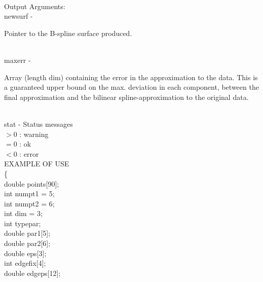 \\
        \>Output Arguments:\\
        \>\>    {\fov newsurf}\> - \>           \begin{minipg2}
                                Pointer to the B-spline surface produced.
                                \end{minipg2}\\
        \>\>    {\fov maxerr}\> - \>    \begin{minipg2}
                                Array (length dim)
                                containing the error in the approximation to the data.
                                This is a guaranteed upper bound on the max. deviation
                                in each component, between the final approximation
                                and the bilinear spline-approximation to the original
                                data.
                                \end{minipg2}\\[0.3ex]
        \>\>    {\fov stat}     \> - \> Status messages\\
                \>\>\>\>\>              $> 0$   : warning\\
                \>\>\>\>\>              $= 0$   : ok\\
                \>\>\>\>\>              $< 0$   : error\\
\newpagetabs
EXAMPLE OF USE\\
                \>      \{ \\
                \>\>    double  \>      {\fov points}[90];\\
                \>\>    int     \>      {\fov numpt1} = 5;\\
                \>\>    int     \>      {\fov numpt2} = 6;\\
                \>\>    int     \>      {\fov dim} = 3;\\
                \>\>    int     \>      {\fov typepar};\\
                \>\>    double  \>      {\fov par1}[5];\\
                \>\>    double  \>      {\fov par2}[6];\\
                \>\>    double  \>      {\fov eps}[3];\\
                \>\>    int     \>      {\fov edgefix}[4];\\
                \>\>    double  \>      {\fov edgeps}[12];\\
